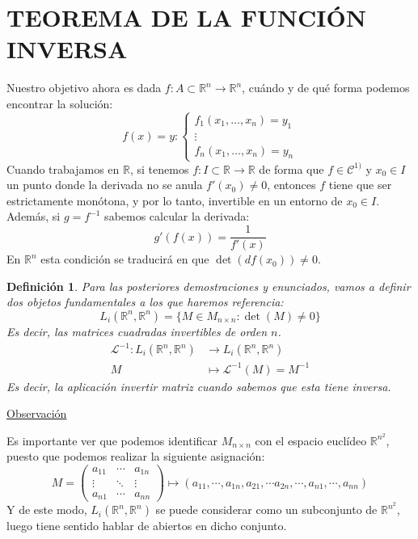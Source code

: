 \documentclass[10pt,a4paper,openright]{book}
\theoremstyle{break}
\newtheorem*{defi}{Definición}
\begin{document}
\section*{TEOREMA DE LA FUNCIÓN INVERSA}
Nuestro objetivo ahora es dada $f : A \subset \mathbb{R}^n \to \mathbb{R}^n$, cuándo y de qué forma podemos encontrar la solución:
$$ f(x) = y : \begin{cases} f_1 (x_1,…,x_n )=y_1 \\ \vdots \\ f_n (x_1,…,x_n )=y_n \end{cases}$$
Cuando trabajamos en $\mathbb{R}$, si tenemos $f : I \subset \mathbb{R} \to \mathbb{R}$ de forma que $f \in \mathcal{C}^{1)}$ y $x_0 \in I$ un punto donde la derivada no se anula $f'(x_0) \neq 0$, entonces $f$ tiene que ser estrictamente monótona, y por lo tanto, invertible en un entorno de $x_0 \in I$. Además, si $g=f^{-1}$ sabemos calcular la derivada: 
$$g' (f(x)) = \frac{1}{f'(x)}$$
En $\mathbb{R}^n$ esta condición se traducirá en que $\det (df(x_0)) \neq 0$.

\begin{defi}
Para las posteriores demostraciones y enunciados, vamos a definir dos objetos fundamentales a los que haremos referencia:
$$L_i (\mathbb{R}^n, \mathbb{R}^n) = \{M \in M_{n \times n} : \det (M) \neq 0\}$$
Es decir, las matrices cuadradas invertibles de orden $n$.
\begin{align*}
\mathcal{L}^{-1} : L_i (\mathbb{R}^n, \mathbb{R}^n) &\to L_i (\mathbb{R}^n, \mathbb{R}^n) \\ M &\mapsto \mathcal{L}^{-1} (M) = M^{-1}
\end{align*}
Es decir, la aplicación invertir matriz cuando sabemos que esta tiene inversa.
\end{defi}

\underline{Observación}

Es importante ver que podemos identificar $M_{n \times n}$ con el espacio euclídeo $\mathbb{R}^{n^2}$, puesto que podemos realizar la siguiente asignación:
$$M = \begin{pmatrix}
a_{11} & \cdots & a_{1n} \\ \vdots & \ddots & \vdots \\ a_{n1} & \cdots & a_{nn}
\end{pmatrix} \longmapsto (a_{11}, \cdots, a_{1n} ,a_{21}, \cdots a_{2n}, \cdots, a_{n1}, \cdots, a_{nn})$$
Y de este modo, $L_i (\mathbb{R}^n, \mathbb{R}^n)$ se puede considerar como un subconjunto de $\mathbb{R}^{n^2}$, luego tiene sentido hablar de abiertos en dicho conjunto.
\end{document}
